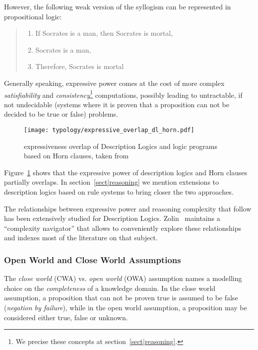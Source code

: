 However, the following weak version of the syllogism can be represented in
propositional logic:

\begin{quote}
\begin{enumerate}
    \item If Socrates is a man, then Socrates is mortal,
    \item Socrates is a man,
    \item Therefore, Socrates is mortal
\end{enumerate}
\end{quote}

Generally speaking, expressive power comes at the cost of more complex
\emph{satisfiability} and \emph{consistency}\footnote{We precise these concepts
at section~\ref{sect|reasoning}.} computations, possibly leading to
untractable, if not undecidable (\ie systems where it is proven that a
proposition can not be decided to be true or false) problems.

\begin{figure}
    \centering
    \texttt{[image: typology/expressive\_overlap\_dl\_horn.pdf]}
    \caption{expressiveness overlap of Description Logics and logic programs
    based on Horn clauses, taken from~\cite{Grosof2003}}
    \label{fig|overlap_dl_horn}
\end{figure}

Figure~\ref{fig|overlap_dl_horn} shows that the expressive power of description
logics and Horn clauses partially overlaps. In section~\ref{sect|reasoning} we
mention extensions to description logics based on rule systems to bring closer
the two approaches.

The relationships between expressive power and reasoning complexity that follow
has been extensively studied for Description Logics.
Zolin~\cite{ZolinDLComplexityNavigator} maintains a ``complexity navigator''
that allows to conveniently explore these relationships and indexes most of the
literature on that subject.

\subsubsection{Open World and Close World Assumptions}

The \emph{close world} (CWA) vs. \emph{open world} (OWA) assumption names a
modelling choice on the \emph{completeness} of a knowledge domain. In the close
world assumption, a proposition that can not be proven true is assumed to be
false (\emph{negation by failure}), while in the open world assumption, a
proposition may be considered either true, false or unknown.

